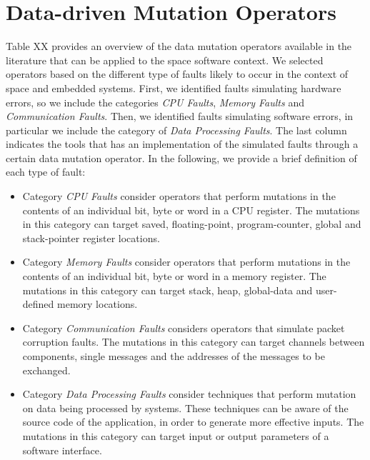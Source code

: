 
\section{Data-driven Mutation Operators}
\label{sec:data_operators}

Table XX provides an overview of the data mutation operators available in the literature that can be applied to the space software context.
We selected operators based on the different type of faults likely to occur in the context of space and embedded systems. 
First, we identified faults simulating hardware errors, so we include the categories \emph{CPU Faults}, \emph{Memory Faults} and \emph{Communication Faults}. Then, we identified faults simulating software errors, in particular we include the category of \emph{Data Processing Faults}. The last column indicates the tools that has an implementation of the simulated faults through a certain data mutation operator. In the following, we provide a brief definition of each type of fault:

\begin{itemize}
	\item Category \emph{CPU Faults} consider operators that perform mutations in the contents of an individual bit, byte or word in a CPU register. The mutations in this category can target saved, floating-point, program-counter, global and stack-pointer register locations. 
	\item Category \emph{Memory Faults} consider operators that perform mutations in the contents of an individual bit, byte or word in a memory register. The mutations in this category can target stack, heap, global-data and user-defined memory locations.
	\item Category \emph{Communication Faults} considers operators that simulate packet corruption faults. The mutations in this category can target channels between components, single messages and the addresses of the messages to be exchanged.
	\item Category \emph{Data Processing Faults} consider techniques that perform mutation on data being processed by systems. These techniques can be aware of the source code of the application, in order to generate more effective inputs. The mutations in this category can target input or output parameters of a software interface.
\end{itemize}
